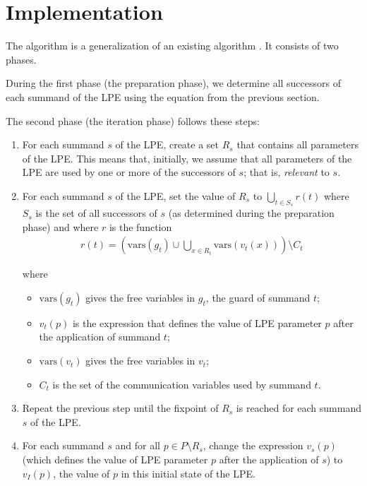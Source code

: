 \section{Implementation}

The algorithm is a generalization of an existing algorithm \cite{van2009state}.
It consists of two phases.

During the first phase (the preparation phase), we determine all successors of each summand of the LPE using the equation from the previous section.

The second phase (the iteration phase) follows these steps:

\begin{enumerate}

\item For each summand $s$ of the LPE, create a set $R_s$ that contains all parameters of the LPE.
This means that, initially, we assume that all parameters of the LPE are used by one or more of the successors of $s$; that is, \emph{relevant} to $s$.

\item For each summand $s$ of the LPE, set the value of $R_s$ to $\bigcup\limits_{t \in S_s}^{} r(t)$ where $S_s$ is the set of all successors of $s$ (as determined during the preparation phase) and where $r$ is the function
\begin{align*}
r(t) = \left( \text{vars}(g_t) \cup \bigcup\limits_{x \in R_t}^{} \text{vars}(v_t(x)) \right) \setminus C_t
\end{align*}

where

\begin{itemize}
\item $\text{vars}(g_t)$ gives the free variables in $g_t$, the guard of summand $t$;
\item $v_t(p)$ is the expression that defines the value of LPE parameter $p$ after the application of summand $t$;
\item $\text{vars}(v_t)$ gives the free variables in $v_t$;
\item $C_t$ is the set of the communication variables used by summand $t$.
\end{itemize}

\item Repeat the previous step until the fixpoint of $R_s$ is reached for each summand $s$ of the LPE.

\item For each summand $s$ and for all $p \in P \setminus R_s$, change the expression $v_s(p)$ (which defines the value of LPE parameter $p$ after the application of $s$) to $v_I(p)$, the value of $p$ in this initial state of the LPE.

\end{enumerate}

